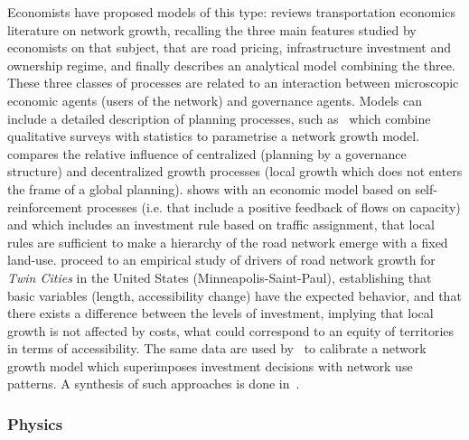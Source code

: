 \documentclass[10pt]{article}
\begin{document}
Economists have proposed models of this type: \cite{zhang2007economics} reviews transportation economics literature on network growth, recalling the three main features studied by economists on that subject, that are road pricing, infrastructure investment and ownership regime, and finally describes an analytical model combining the three. These three classes of processes are related to an interaction between microscopic economic agents (users of the network) and governance agents. Models can include a detailed description of planning processes, such as~\cite{levinson2012forecasting} which combine qualitative surveys with statistics to parametrise a network growth model.  \cite{xie2009jurisdictional} compares the relative influence of centralized (planning by a governance structure) and decentralized growth processes (local growth which does not enters the frame of a global planning). 
\cite{yerra2005emergence} shows with an economic model based on self-reinforcement processes (i.e. that include a positive feedback of flows on capacity) and which includes an investment rule based on traffic assignment, that local rules are sufficient to make a hierarchy of the road network emerge with a fixed land-use. \cite{levinson2003induced} proceed to an empirical study of drivers of road network growth for \emph{Twin Cities} in the United States (Minneapolis-Saint-Paul), establishing that basic variables (length, accessibility change) have the expected behavior, and that there exists a difference between the levels of investment, implying that local growth is not affected by costs, what could correspond to an equity of territories in terms of accessibility. The same data are used by~\cite{zhang2016model} to calibrate a network growth model which superimposes investment decisions with network use patterns. A synthesis of such approaches is done in~\cite{xie2011evolving}.
 
\subsubsection{Physics}
 
\end{document}
